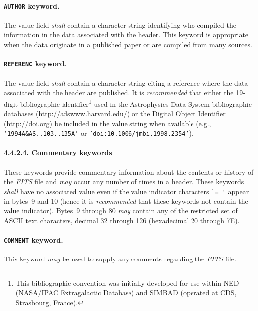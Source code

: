 \documentclass[onecolumn]{aa}
\begin{document}
 \paragraph{{\tt AUTHOR} keyword.}
 The value field {\em shall} contain a character 
 string
 identifying who compiled the information
 in the data associated with the header. This keyword
 is appropriate when the data originate in a published
 paper or are compiled from many sources.
  
 \paragraph{{\tt REFERENC} keyword.}
 The value field {\em shall} contain a character 
 string
 citing a reference where the data associated with the
 header are published.  It is {\em recommended} that either
 the 19-digit bibliographic identifier\footnote{This bibliographic 
 convention \citep{schmitz95} was initially developed for use within NED (NASA/IPAC 
 Extragalactic Database) and SIMBAD (operated at CDS, Strasbourg, France).}
 used in the Astrophysics Data System bibliographic databases
 (\url{http://adswww.harvard.edu/}) 
 or the Digital Object Identifier (\url{http://doi.org})
 be included in the value 
 string when available (e.g., {\tt '1994A\&AS..103..135A'}
 or {\tt 'doi:10.1006/jmbi.1998.2354'}).
  
 \paragraph{4.4.2.4. Commentary keywords}
  \label{s:comk}
\paragraph{}
 These keywords provide commentary information about the contents or history
 of the {\em FITS\/} file and {\em may} occur any number of times in a header.
 These keywords {\em shall} have no associated value
 even if the value indicator characters \verb*+`= '+ appear in bytes~9 and 10
 (hence it is {\em recommended} that these keywords not contain the value indicator).
 Bytes~9 through 80 {\em may} contain any of the restricted set of ASCII
 text characters, decimal 32 through 126 (hexadecimal 20 through 7E).
  
  \paragraph{{\tt COMMENT} keyword.}
  This keyword {\em may} be used to supply any comments regarding the {\em FITS\/} file.
\end{document}

